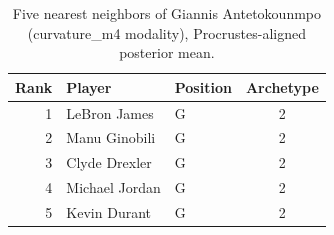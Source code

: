 \begin{table}[htbp]
  \centering\small
  \begin{tabular}{rllc}
    \toprule
    Rank & Player & Position & Archetype \\
    \midrule
    1 & LeBron James & G & 2 \\
    2 & Manu Ginobili & G & 2 \\
    3 & Clyde Drexler & G & 2 \\
    4 & Michael Jordan & G & 2 \\
    5 & Kevin Durant & G & 2 \\
    \bottomrule
  \end{tabular}
  \caption{Five nearest neighbors of Giannis Antetokounmpo (curvature_m4 modality), Procrustes-aligned posterior mean.}
  \label{tab:Giannis_Antetokounmpo_neighbors_curvature_m4}
\end{table}

